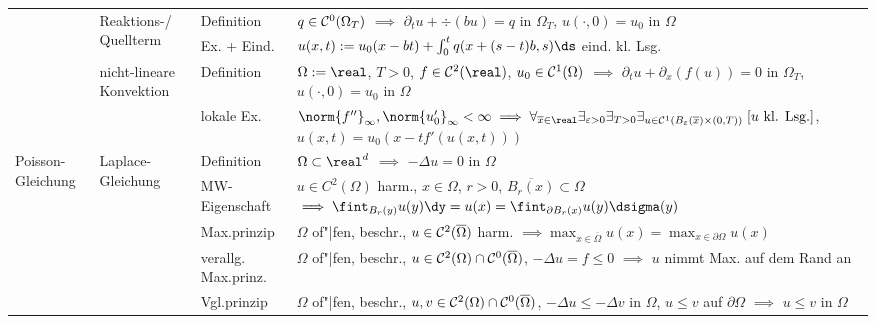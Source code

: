 \begin{landscape}
\begin{tabular}{p{20mm}p{20mm}p{30mm}p{169mm}}
        \cmidrule{2-4}

        &\multirow{2}{20mm}{Reaktions-/ Quellterm}&
        Definition&
        $q \in \mathcal{C}^0(\Omega_T)$
        $\implies$
        $\partial_t u + \div(bu) = q$ in $\Omega_T$, $u(\cdot, 0) = u_0$ in $\Omega$\\

        &&Ex. + Eind.&
        $u(x, t) := u_0(x - bt) + \int_0^t q(x + (s-t)b, s)\ds$ eind. kl. Lsg.\\

        \cmidrule{2-4}

        &\multirow{2}{20mm}{nicht-lineare Konvektion}&
        Definition&
        $\Omega := \real$, $T > 0$, $f \in \C^2(\real)$, $u_0 \in \mathcal{C}^1(\Omega)$
        $\implies$
        $\partial_t u + \partial_x(f(u)) = 0$ in $\Omega_T$, $u(\cdot, 0) = u_0$ in $\Omega$\\

        &&lokale Ex.&
        $\norm{f''}_\infty, \norm{u_0'}_\infty < \infty
        \implies \forall_{\overline{x} \in \real} \exists_{\varepsilon > 0} \exists_{T > 0}
        \exists_{u \in \C^1(B_\varepsilon(\overline{x}) \times (0, T))}\;
        [\text{$u$ kl. Lsg.}]$,
        $u(x, t) = u_0(x - tf'(u(x, t)))$\\

        \midrule

        \multirow{17}{20mm}{Poisson-Gleichung}&
        \multirow{8}{20mm}{Laplace-Gleichung}&
        Definition&
        $\Omega \subset \real^d$
        $\implies$
        $-\Delta u = 0$ in $\Omega$\\

        &&MW-Eigenschaft&
        $u \in C^2(\Omega)$ harm., $x \in \Omega$, $r > 0$, $\overline{B_r(x)} \subset \Omega$
        $\implies \fint_{B_r(y)} u(y) \dy = u(x) = \fint_{\partial B_r(x)} u(y) \dsigma(y)$\\

        &&Max.prinzip&
        $\Omega$ of"|fen, beschr., $u \in \mathcal{C}^2(\overline{\Omega})$ harm.
        $\implies \max_{x \in \overline{\Omega}} u(x) = \max_{x \in \partial\Omega} u(x)$\\

        &&verallg. Max.prinz.&
        $\Omega$ of"|fen, beschr., $u \in \mathcal{C}^2(\Omega) \cap \mathcal{C}^0(\overline{\Omega})$,
        $-\Delta u = f \le 0$
        $\implies$ $u$ nimmt Max. auf dem Rand an\\

        &&Vgl.prinzip&
        $\Omega$ of"|fen, beschr., $u, v \in \mathcal{C}^2(\Omega) \cap \mathcal{C}^0(\overline{\Omega})$,
        $-\Delta u \le -\Delta v$ in $\Omega$, $u \le v$ auf $\partial\Omega$
        $\implies$ $u \le v$ in $\Omega$\\


\end{tabular}
\end{landscape}
